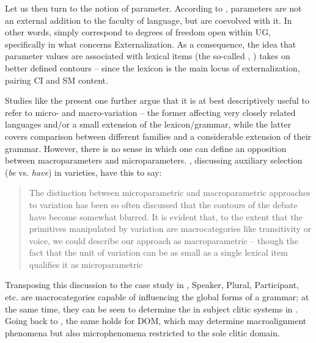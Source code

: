 \documentclass[output=paper]{langsci/langscibook}
\begin{document}
Let us then turn to the notion of parameter. According to \citet{BerCho2011},
parameters are not an external addition to the faculty of language, but are
coevolved with it. In other words,  simply correspond to degrees of
freedom open within \gls{UG}, specifically in what concerns Externalization. As a
consequence, the idea that parameter values are associated with lexical items
(the so-called , \citealt{Baker2008b}) takes on
better defined contours – since the lexicon is the main locus of
externalization, pairing \gls{CI} and \gls{SM} content.

Studies like the present one further argue that it is at best descriptively
useful to refer to micro- and macro-variation – the former
affecting very closely related languages and/or a small extension of the
lexicon/grammar, while the latter covers comparison between different families
and a considerable extension of their grammar. However, there is no sense in
which one can define an opposition between macroparameters and
microparameters.  \citet{ManSav2011}, discussing
auxiliary selection (\emph{be} vs.  \emph{have}) in
 varieties, have this to say:

\begin{quote}The distinction between
microparametric and macroparametric approaches to variation has been so often
discussed that the contours of the debate have become somewhat blurred. It is
evident that, to the extent that the primitives manipulated by variation are
macrocategories like transitivity or voice, we could describe our approach as
macroparametric – though the fact that the unit of variation can be as small as
a single lexical item qualifies it as microparametric
\end{quote}

\noindent Transposing this
discussion to the case study in , Speaker, Plural,
Participant, etc.  are macrocategories capable of influencing the global forms
of a grammar; at the same time, they can be seen to determine the
 in subject clitic systems in .
Going back to , the same holds for DOM, which may determine
macroalignment phenomena but also microphenomena restricted to the sole clitic
domain.
\end{document}
